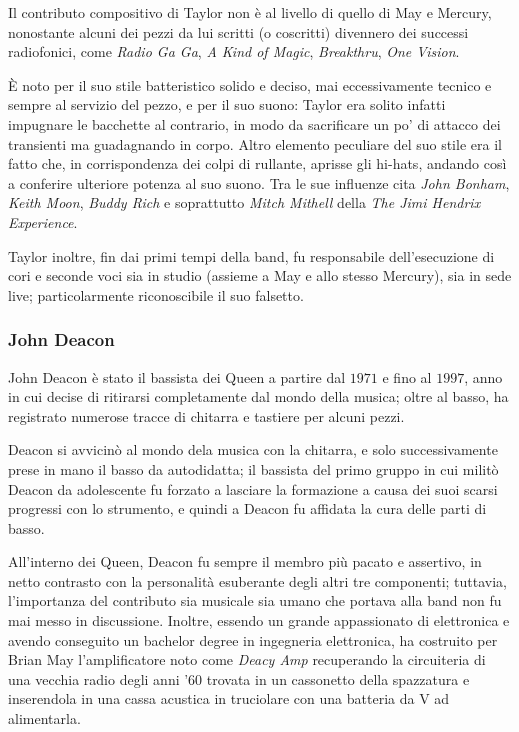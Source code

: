 \documentclass[12pt]{article}
\begin{document}
Il contributo compositivo di Taylor non è al livello di quello di May e Mercury, nonostante alcuni dei pezzi da lui scritti (o coscritti) divennero dei successi radiofonici, come \emph{Radio Ga Ga}, \emph{A Kind of Magic}, \emph{Breakthru}, \emph{One Vision}.

È noto per il suo stile batteristico solido e deciso, mai eccessivamente tecnico e sempre al servizio del pezzo, e per il suo suono: Taylor era solito infatti impugnare le bacchette al contrario, in modo da sacrificare un po' di attacco dei transienti ma guadagnando in corpo. Altro elemento peculiare del suo stile era il fatto che, in corrispondenza dei colpi di rullante, aprisse gli hi-hats, andando così a conferire ulteriore potenza al suo suono. Tra le sue influenze cita \emph{John Bonham}, \emph{Keith Moon}, \emph{Buddy Rich} e soprattutto \emph{Mitch Mithell} della \emph{The Jimi Hendrix Experience}.

Taylor inoltre, fin dai primi tempi della band, fu responsabile dell'esecuzione di cori e seconde voci sia in studio (assieme a May e allo stesso Mercury), sia in sede live; particolarmente riconoscibile il suo falsetto.

\subsubsection{John Deacon}
John Deacon è stato il bassista dei Queen a partire dal \(1971\) e fino al \(1997\), anno in cui decise di ritirarsi completamente dal mondo della musica; oltre al basso, ha registrato numerose tracce di chitarra e tastiere per alcuni pezzi.

Deacon si avvicinò al mondo dela musica con la chitarra, e solo successivamente prese in mano il basso da autodidatta; il bassista del primo gruppo in cui militò Deacon da adolescente fu forzato a lasciare la formazione a causa dei suoi scarsi progressi con lo strumento, e quindi a Deacon fu affidata la cura delle parti di basso.

All'interno dei Queen, Deacon fu sempre il membro più pacato e assertivo, in netto contrasto con la personalità esuberante degli altri tre componenti; tuttavia, l'importanza del contributo sia musicale sia umano che portava alla band non fu mai messo in discussione. Inoltre, essendo un grande appassionato di elettronica e avendo conseguito un bachelor degree in ingegneria elettronica, ha costruito per Brian May l'amplificatore noto come \emph{Deacy Amp} recuperando la circuiteria di una vecchia radio degli anni '60 trovata in un cassonetto della spazzatura e inserendola in una cassa acustica in truciolare con una batteria da \unit[9]{V} ad alimentarla.
\end{document}
